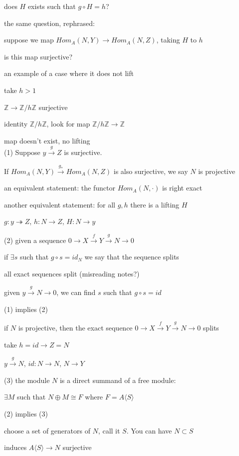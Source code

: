 \documentclass[12pt]{article}
\begin{document}
does $H$ exists such that $g \circ H = h$?

the same question, rephrased:

suppose we map $Hom_A(N, Y) \to Hom_A(N, Z)$, taking $H$ to $h$

is this map surjective?

\noindent
an example of a case where it does not lift

take $h > 1$

$\mathds{Z} \to \mathds{Z}/h\mathds{Z}$ surjective

identity $\mathds{Z}/h\mathds{Z}$, look for map $\mathds{Z}/h\mathds{Z} \to \mathds{Z}$

map doesn't exist, no lifting\\

\noindent
(1) Suppose $y \xrightarrow{g} Z$ is surjective.

If $Hom_A(N, Y) \xrightarrow{g_*} Hom_A(N, Z)$ is also surjective, we say $N$ is projective

an equivalent statement: the functor $Hom_A(N, \cdot)$ is right exact

another equivalent statement: for all $g, h$ there is a lifting $H$

$g: y \twoheadrightarrow Z$, $h: N \to Z$, $H: N \to y$

\noindent
(2) given a sequence $0 \to X \xrightarrow{f} Y \xrightarrow{g} N \to 0$

if $\exists s$ such that $g \circ s = id_N$ we say that the sequence splits

all exact sequences split (misreading notes?)

given $y \xrightarrow{g} N \to 0$, we can find $s$ such that $g \circ s = id$

\noindent
(1) implies (2)

if $N$ is projective, then the exact sequence $0 \to X \xrightarrow{f} Y \xrightarrow{g} N \to 0$ splits

take $h = id \to Z = N$

$y \xrightarrow{g} N$, $id: N \to N$, $N \to Y$

\noindent
(3) the module $N$ is a direct summand of a free module:

$\exists M$ such that $N \oplus M \cong F$ where $F = A\langle S \rangle$

\noindent
(2) implies (3)

choose a set of generators of $N$, call it $S$.  You can have $N \subset S$

induces $A\langle S \rangle \to N$ surjective
\end{document}
